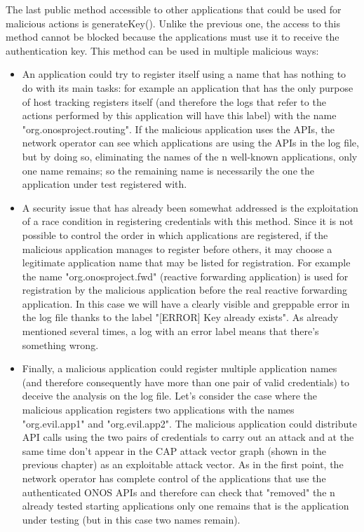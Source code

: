\documentclass[a4paper,10pt]{memoir}
\begin{document}
The last public method accessible to other applications that could be used for malicious actions is generateKey(). Unlike the previous one, the access to this method cannot be blocked because the applications must use it to receive the authentication key.
This method can be used in multiple malicious ways:
\begin{itemize}
    \item An application could try to register itself using a name that has nothing to do with its main tasks: for example an application that has the only purpose of host tracking registers itself (and therefore the logs that refer to the actions performed by this application will have this label) with the name "org.onosproject.routing". If the malicious application uses the APIs, the network operator can see which applications are using the APIs in the log file, but by doing so, eliminating the names of the n well-known applications, only one name remains; so the remaining name is necessarily the one the application under test registered with.
    \item A security issue that has already been somewhat addressed is the exploitation of a race condition in registering credentials with this method. Since it is not possible to control the order in which applications are registered, if the malicious application manages to register before others, it may choose a legitimate application name that may be listed for registration. For example the name "org.onosproject.fwd" (reactive forwarding application) is used for registration by the malicious application before the real reactive forwarding application. In this case we will have a clearly visible and greppable error in the log file thanks to the label "[ERROR] Key already exists". As already mentioned several times, a log with an error label means that there's something wrong.
    \item Finally, a malicious application could register multiple application names (and therefore consequently have more than one pair of valid credentials) to deceive the analysis on the log file. Let's consider the case where the malicious application registers two applications with the names "org.evil.app1" and "org.evil.app2". The malicious application could distribute API calls using the two pairs of credentials to carry out an attack and at the same time don't appear in the CAP attack vector graph (shown in the previous chapter) as an exploitable attack vector. As in the first point, the network operator has complete control of the applications that use the authenticated ONOS APIs and therefore can check that "removed" the n already tested starting applications only one remains that is the application under testing (but in this case two names remain).
\end{itemize}
\end{document}
